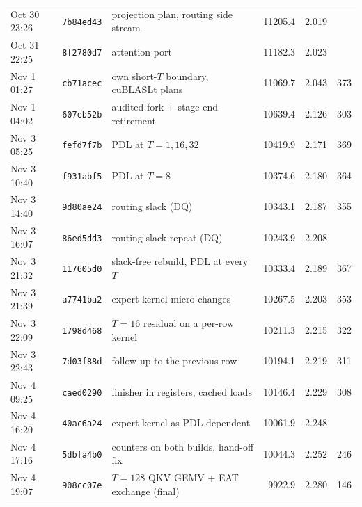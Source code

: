 \documentclass[11pt]{article}
\begin{document}
\begin{table}[h]
\begin{tabular}{lllrrr}
Oct 30 23:26 & \texttt{7b84ed43} & projection plan, routing side stream & \num{11205.4} & 2.019 & \\
Oct 31 22:25 & \texttt{8f2780d7} & attention port & \num{11182.3} & 2.023 & \\
Nov 1 01:27 & \texttt{cb71acec} & own short-$T$ boundary, cuBLASLt plans & \num{11069.7} & 2.043 & 373\\
Nov 1 04:02 & \texttt{607eb52b} & audited fork + stage-end retirement & \num{10639.4} & 2.126 & 303\\
Nov 3 05:25 & \texttt{fefd7f7b} & PDL at $T=1,16,32$ & \num{10419.9} & 2.171 & 369\\
Nov 3 10:40 & \texttt{f931abf5} & PDL at $T=8$ & \num{10374.6} & 2.180 & 364\\
Nov 3 14:40 & \texttt{9d80ae24} & routing slack (DQ) & \num{10343.1} & 2.187 & 355\\
Nov 3 16:07 & \texttt{86ed5dd3} & routing slack repeat (DQ) & \num{10243.9} & 2.208 & \\
Nov 3 21:32 & \texttt{117605d0} & slack-free rebuild, PDL at every $T$ & \num{10333.4} & 2.189 & 367\\
Nov 3 21:39 & \texttt{a7741ba2} & expert-kernel micro changes & \num{10267.5} & 2.203 & 353\\
Nov 3 22:09 & \texttt{1798d468} & $T=16$ residual on a per-row kernel & \num{10211.3} & 2.215 & 322\\
Nov 3 22:43 & \texttt{7d03f88d} & follow-up to the previous row & \num{10194.1} & 2.219 & 311\\
Nov 4 09:25 & \texttt{caed0290} & finisher in registers, cached loads & \num{10146.4} & 2.229 & 308\\
Nov 4 16:20 & \texttt{40ac6a24} & expert kernel as PDL dependent & \num{10061.9} & 2.248 & \\
Nov 4 17:16 & \texttt{5dbfa4b0} & counters on both builds, hand-off fix & \num{10044.3} & 2.252 & 246\\
Nov 4 19:07 & \texttt{908cc07e} & $T=128$ QKV GEMV + EAT exchange (final) & \num{9922.9} & 2.280 & 146\\
\bottomrule
\end{tabular}
\end{table}
\end{document}
